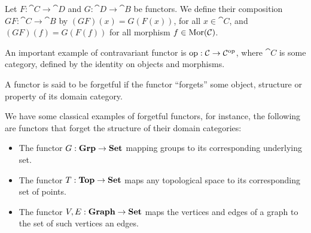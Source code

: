 \begin{definition}
\label{def:composition-functors}
Let \(F: \cat C \to \cat D\) and \(G: \cat D \to \cat B\) be functors. We define
their composition \(G F: \cat C \to \cat B\) by \((GF)(x) = G(F(x))\), for all
\(x \in \cat C\), and \((G F)(f) = G(F(f))\) for all morphism \(f \in \operatorname{Mor}(\mathcal
C)\).
\end{definition}

\begin{example}
\label{exp:opposite-category}
An important example of contravariant functor is \(\mathrm{op}: \mathcal C \to \mathcal
C^{\mathrm{op}}\), where \(\cat C\) is some category, defined by the identity on objects
and morphisms.
\end{example}

\begin{definition}
A functor is said to be forgetful if the functor ``forgets'' some object,
structure or property of its domain category.
\end{definition}

\begin{example}
We have some classical examples of forgetful functors, for instance, the
following are functors that forget the structure of their domain categories:
\begin{itemize}
\item The functor \(G: {\textbf{Grp}} \to {\textbf{Set}}\) mapping groups to its corresponding
  underlying set.
\item The functor \(T: {\textbf{Top}} \to {\textbf{Set}}\) maps any topological space
  to its corresponding set of points.
\item The functor \(V, E: {\textbf{Graph}} \to {\textbf{Set}}\) maps the vertices and
  edges of a graph to the set of such vertices an edges.
\end{itemize}
\end{example}

